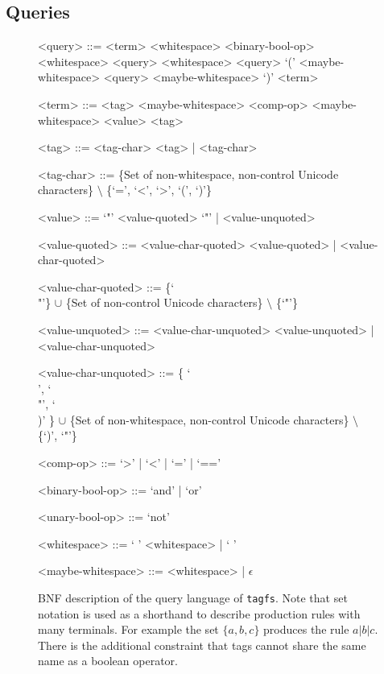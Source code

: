 \subsection{Queries}
\label{sec:queries}

\begin{figure}[t]
\begin{grammar}
<query> ::= <term> <whitespace> <binary-bool-op> <whitespace> <query>
     <whitespace> <query>
    \alt `(' <maybe-whitespace> <query> <maybe-whitespace> `)'
    \alt <term>

<term> ::= <tag> <maybe-whitespace> <comp-op> <maybe-whitespace> <value>
    \alt <tag>

<tag> ::= <tag-char> <tag> | <tag-char>

<tag-char> ::= \{Set of non-whitespace, non-control Unicode characters\}
    $\setminus$ \{`=', `<', `>', `(', `)'\}

<value> ::= `"' <value-quoted> `"' | <value-unquoted>

<value-quoted> ::= <value-char-quoted> <value-quoted>
    | <value-char-quoted>

    <value-char-quoted> ::= \{`\\"'\} $\cup$ \{Set of non-control Unicode
        characters\} $\setminus$ \{`"'\}

<value-unquoted> ::= <value-char-unquoted> <value-unquoted>
    | <value-char-unquoted>

<value-char-unquoted> ::= \{ `\\ ', `\\"', `\\)' \} $\cup$ \{Set of
    non-whitespace, non-control Unicode characters\} $\setminus$ \{`)', `"'\}

<comp-op> ::= `>' | `<' | `=' | `=='

<binary-bool-op> ::= `and' | `or'

<unary-bool-op> ::= `not'

<whitespace> ::= ` ' <whitespace> | ` '

<maybe-whitespace> ::= <whitespace> | $\epsilon$

\end{grammar}
\label{fig:query-bnf}
\caption[BNF description of the query language of \texttt{tagfs}]
    {BNF description of the query language of \texttt{tagfs}. Note that set
    notation is used as a shorthand to describe production rules with many
    terminals. For example the set $\{a, b, c\}$ produces the rule $a \vert b
    \vert c$. There is the additional constraint that tags cannot share the
    same name as a boolean operator.}
\end{figure}

